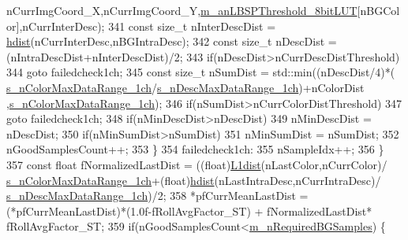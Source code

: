 \begin{DoxyCode}
      nCurrImgCoord\_X,nCurrImgCoord\_Y,\mbox{\hyperlink{class_background_subtractor_l_b_s_p_aefe69d94f08b2c4ba73ad1d254ad9153}{m\_anLBSPThreshold\_8bitLUT}}[nBGColor],nCurrInterDesc);
341                     \textcolor{keyword}{const} \textcolor{keywordtype}{size\_t} nInterDescDist = \mbox{\hyperlink{_distance_utils_8h_ab13812ef6e21af771d6c0a856cd941b0}{hdist}}(nCurrInterDesc,nBGIntraDesc);
342                     \textcolor{keyword}{const} \textcolor{keywordtype}{size\_t} nDescDist = (nIntraDescDist+nInterDescDist)/2;
343                     \textcolor{keywordflow}{if}(nDescDist>nCurrDescDistThreshold)
344                         \textcolor{keywordflow}{goto} failedcheck1ch;
345                     \textcolor{keyword}{const} \textcolor{keywordtype}{size\_t} nSumDist = std::min((nDescDist/4)*(
      \mbox{\hyperlink{_background_subtractor_su_b_s_e_n_s_e_8cpp_ad0ce3de05453a1b3738f711d9955031f}{s\_nColorMaxDataRange\_1ch}}/\mbox{\hyperlink{_background_subtractor_su_b_s_e_n_s_e_8cpp_a15305d6ff106cc0ab9f1b7cfb21a27c7}{s\_nDescMaxDataRange\_1ch}})+nColorDist
      ,\mbox{\hyperlink{_background_subtractor_su_b_s_e_n_s_e_8cpp_ad0ce3de05453a1b3738f711d9955031f}{s\_nColorMaxDataRange\_1ch}});
346                     \textcolor{keywordflow}{if}(nSumDist>nCurrColorDistThreshold)
347                         \textcolor{keywordflow}{goto} failedcheck1ch;
348                     \textcolor{keywordflow}{if}(nMinDescDist>nDescDist)
349                         nMinDescDist = nDescDist;
350                     \textcolor{keywordflow}{if}(nMinSumDist>nSumDist)
351                         nMinSumDist = nSumDist;
352                     nGoodSamplesCount++;
353                 \}
354                 failedcheck1ch:
355                 nSampleIdx++;
356             \}
357             \textcolor{keyword}{const} \textcolor{keywordtype}{float} fNormalizedLastDist = ((float)\mbox{\hyperlink{_distance_utils_8h_ab6ec458f6d3fb6fb4e6cda3808e61703}{L1dist}}(nLastColor,nCurrColor)/
      \mbox{\hyperlink{_background_subtractor_su_b_s_e_n_s_e_8cpp_ad0ce3de05453a1b3738f711d9955031f}{s\_nColorMaxDataRange\_1ch}}+(float)\mbox{\hyperlink{_distance_utils_8h_ab13812ef6e21af771d6c0a856cd941b0}{hdist}}(nLastIntraDesc,nCurrIntraDesc)/
      \mbox{\hyperlink{_background_subtractor_su_b_s_e_n_s_e_8cpp_a15305d6ff106cc0ab9f1b7cfb21a27c7}{s\_nDescMaxDataRange\_1ch}})/2;
358             *pfCurrMeanLastDist = (*pfCurrMeanLastDist)*(1.0f-fRollAvgFactor\_ST) + fNormalizedLastDist*
      fRollAvgFactor\_ST;
359             \textcolor{keywordflow}{if}(nGoodSamplesCount<\mbox{\hyperlink{class_background_subtractor_su_b_s_e_n_s_e_aca07c4307021623f9055832506cad1d6}{m\_nRequiredBGSamples}}) \{

\end{DoxyCode}
